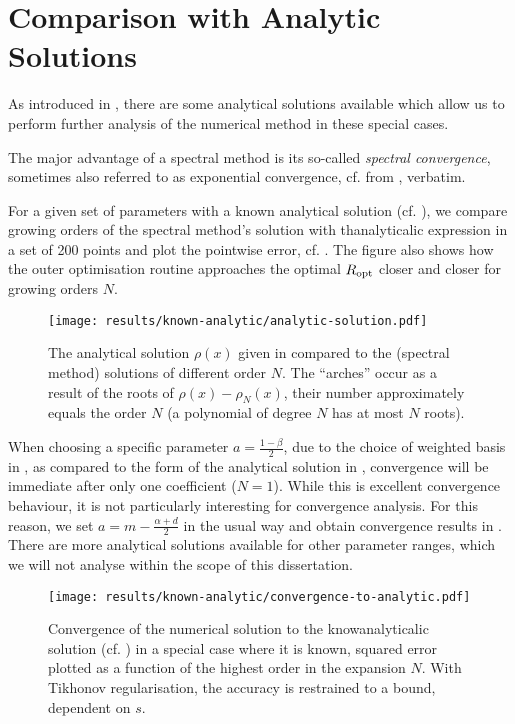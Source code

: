 \section{Comparison with Analytic Solutions}
As introduced in , there are some analytical solutions available which allow us to perform further analysis of the numerical method in these special cases.

The major advantage of a spectral method is its so-called \textit{spectral convergence}, sometimes also referred to as exponential convergence, cf.  from \cite{2023-damtp-spectral-methods}, verbatim.


For a given set of parameters with a known analytical solution (cf. ), we compare growing orders of the spectral method's solution with thanalyticalic expression in a set of 200 points and plot the pointwise error, cf. .
The figure also shows how the outer optimisation routine approaches the optimal $R_{\rm opt}$ closer and closer for growing orders $N$.

\begin{figure}[H]
  \centering
  \texttt{[image: results/known-analytic/analytic-solution.pdf]}
  \caption[Comparison with analytical solutions and error]{
    The analytical solution $\rho(x)$ given in  compared to the (spectral method) solutions of different order $N$.
    The ``arches'' occur as a result of the roots of $\rho(x) - \rho_N(x)$, their number approximately equals the order $N$ (a polynomial of degree $N$ has at most $N$ roots).
  }
  \label{fig:analytic-solution}
\end{figure}

When choosing a specific parameter $a = \frac{1-\beta}{2}$, due to the choice of weighted basis in , as compared to the form of the analytical solution in , convergence will be immediate after only one coefficient ($N=1$).
While this is excellent convergence behaviour, it is not particularly interesting for convergence analysis.
For this reason, we set $a = m - \frac{\alpha+d}{2}$ in the usual way and obtain convergence results in .
There are more analytical solutions available for other parameter ranges, which we will not analyse within the scope of this dissertation.

\begin{figure}[H]
  \centering
  \texttt{[image: results/known-analytic/convergence-to-analytic.pdf]}
  \caption[Convergence to analytical solution]{Convergence of the numerical solution to the knowanalyticalic solution (cf. ) in a special case where it is known, squared error plotted as a function of the highest order in the expansion $N$. With Tikhonov regularisation, the accuracy is restrained to a bound, dependent on $s$.}
  \label{fig:convergence-to-analytic}
\end{figure}
